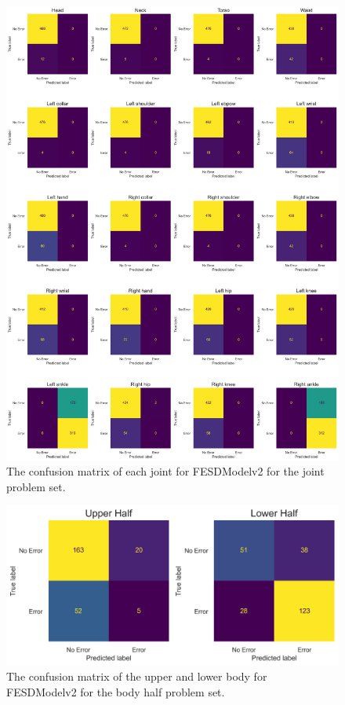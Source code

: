 \begin{figure}[htbp]
  \centering
  \includegraphics[width=.8\linewidth]{figures/Results/v2/confusion/joints_joint.png}
  \caption[Confusion matrix of FESDModelv2 for each Joint]{The confusion matrix of each joint for FESDModelv2 for the joint problem set.}
  \label{fig:conf_v2_jts}
\end{figure}

\begin{figure}[htbp]
  \centering
  \includegraphics[width=.8\linewidth]{figures/Results/v2/confusion/body_halves_half.png}
  \caption[Confusion matrix of FESDModelv2 for each Body Half]{The confusion matrix of the upper and lower body for FESDModelv2 for the body half problem set.}
  \label{fig:conf_v2_hb_ul}
\end{figure}

\FloatBarrier